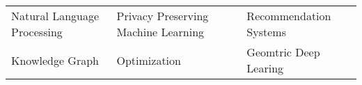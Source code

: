 

{\fontsize{10pt}{1.5em}\bodyfontlight\upshape\color{text}
  \setlength\extrarowheight{-3pt}
  \begin{tabular*}{\textwidth}{L{\textwidth/3} L{\textwidth/3} L{\textwidth/3}}
    Natural Language Processing & Privacy Preserving Machine Learning & Recommendation Systems \\
    Knowledge Graph & Optimization & Geomtric Deep Learing \\
	  
\end{tabular*}

\fontsize{10pt}{1em}\footerfont\upshape\color{text}
\vspace{-1em}
}
